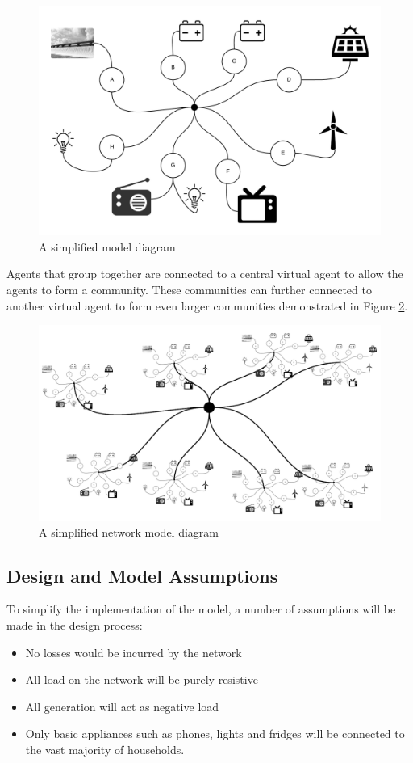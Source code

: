 \clearpage
\begin{figure}[h!]
	\centering
	\includegraphics[scale=0.8]{Images/Model.png}
	\caption{A simplified model diagram}
	\label{fig:SimpleModel}
\end{figure}

Agents that group together are connected to a central virtual agent to allow the agents to form a community. These communities can further connected to another virtual agent to form even larger communities demonstrated in Figure \ref{fig:SimpleModel2}. 

\begin{figure}[h!]
	\centering
	\includegraphics[scale = 0.9]{Images/Model2.png}
	\caption{A simplified network model diagram}
	\label{fig:SimpleModel2}
\end{figure}


\subsection*{Design and Model Assumptions}
To simplify the implementation of the model, a number of assumptions will be made in the design process:
\begin{itemize}
	\item No losses would be incurred by the network
	\item All load on the network will be purely resistive
	\item All generation will act as negative load
	\item Only basic appliances such as phones, lights and fridges will be connected to the vast majority of households. 
\end{itemize}

